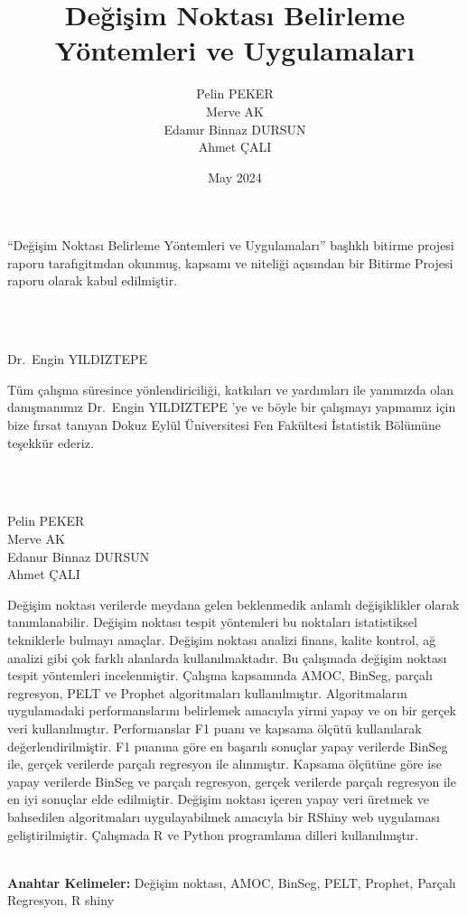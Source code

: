 \documentclass[12pt,twoside]{deuthesis}
\title{Değişim Noktası Belirleme Yöntemleri ve Uygulamaları}
\author{Pelin PEKER \\ Merve AK \\ Edanur Binnaz DURSUN \\ Ahmet ÇALI} %
\date{May 2024}
\begin{document}
  \maketitle

\frontmatter %
\pagestyle{empty} %

\begin{preface}
	``Değişim Noktası Belirleme Yöntemleri ve Uygulamaları'' başlıklı bitirme projesi raporu tarafıgitmdan okunmuş, kapsamı ve niteliği açısından bir Bitirme Projesi raporu olarak kabul edilmiştir.\\
\strut \\
\strut \\
Dr.~Engin YILDIZTEPE
\end{preface}

  \begin{acknowledgements}
    Tüm çalışma süresince yönlendiriciliği, katkıları ve yardımları ile yanımızda olan danışmanımız Dr.~Engin YILDIZTEPE 'ye ve böyle bir çalışmayı yapmamız için bize fırsat tanıyan Dokuz Eylül Üniversitesi Fen Fakültesi İstatistik Bölümüne teşekkür ederiz.\\
    \strut \\
    \strut \\
    Pelin PEKER\\
    Merve AK\\
    Edanur Binnaz DURSUN\\
    Ahmet ÇALI\\
  \end{acknowledgements}

\begin{abstractTR}
	Değişim noktası verilerde meydana gelen beklenmedik anlamlı değişiklikler olarak tanımlanabilir. Değişim noktası tespit yöntemleri bu noktaları istatistiksel tekniklerle bulmayı amaçlar. Değişim noktası analizi finans, kalite kontrol, ağ analizi gibi çok farklı alanlarda kullanılmaktadır. Bu çalışmada değişim noktası tespit yöntemleri incelenmiştir. Çalışma kapsamında AMOC, BinSeg, parçalı regresyon, PELT ve Prophet algoritmaları kullanılmıştır. Algoritmaların uygulamadaki performanslarını belirlemek amacıyla yirmi yapay ve on bir gerçek veri kullanılmıştır. Performanslar F1 puanı ve kapsama ölçütü kullanılarak değerlendirilmiştir. F1 puanına göre en başarılı sonuçlar yapay verilerde BinSeg ile, gerçek verilerde parçalı regresyon ile alınmıştır. Kapsama ölçütüne göre ise yapay verilerde BinSeg ve parçalı regresyon, gerçek verilerde parçalı regresyon ile en iyi sonuçlar elde edilmiştir. Değişim noktası içeren yapay veri üretmek ve bahsedilen algoritmaları uygulayabilmek amacıyla bir RShiny web uygulaması geliştirilmiştir. Çalışmada R ve Python programlama dilleri kullanılmıştır.\\
\strut \\

\textbf{Anahtar Kelimeler:} Değişim noktası, AMOC, BinSeg, PELT, Prophet, Parçalı Regresyon, R shiny
\end{abstractTR}
\end{document}
